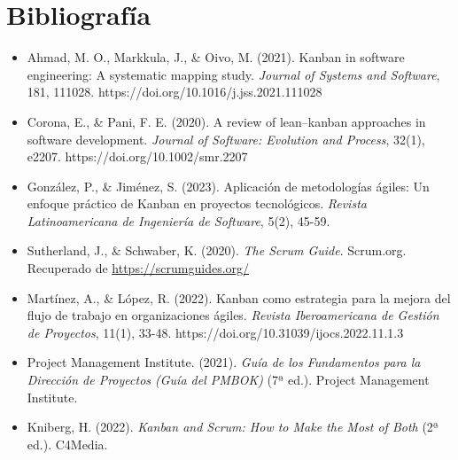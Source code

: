\section{Bibliografía}

\begin{itemize}
    \item Ahmad, M. O., Markkula, J., \& Oivo, M. (2021). Kanban in software engineering: A systematic mapping study. \textit{Journal of Systems and Software}, 181, 111028. https://doi.org/10.1016/j.jss.2021.111028

    \item Corona, E., \& Pani, F. E. (2020). A review of lean–kanban approaches in software development. \textit{Journal of Software: Evolution and Process}, 32(1), e2207. https://doi.org/10.1002/smr.2207

    \item González, P., \& Jiménez, S. (2023). Aplicación de metodologías ágiles: Un enfoque práctico de Kanban en proyectos tecnológicos. \textit{Revista Latinoamericana de Ingeniería de Software}, 5(2), 45-59.

    \item Sutherland, J., \& Schwaber, K. (2020). \textit{The Scrum Guide}. Scrum.org. Recuperado de \url{https://scrumguides.org/}

    \item Martínez, A., \& López, R. (2022). Kanban como estrategia para la mejora del flujo de trabajo en organizaciones ágiles. \textit{Revista Iberoamericana de Gestión de Proyectos}, 11(1), 33-48. https://doi.org/10.31039/ijocs.2022.11.1.3

    \item Project Management Institute. (2021). \textit{Guía de los Fundamentos para la Dirección de Proyectos (Guía del PMBOK)} (7ª ed.). Project Management Institute.

    \item Kniberg, H. (2022). \textit{Kanban and Scrum: How to Make the Most of Both} (2ª ed.). C4Media.
\end{itemize}

